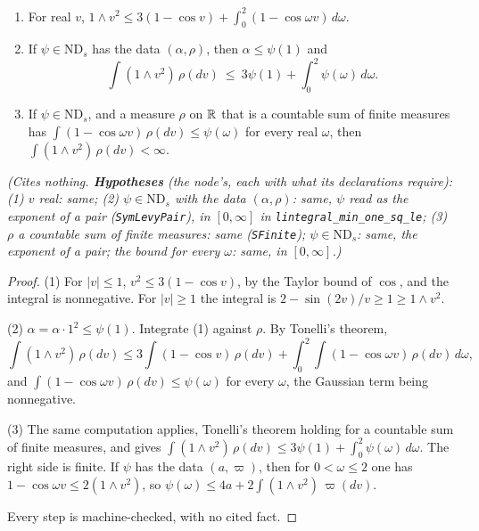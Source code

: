 \begin{lemma}
\label{lem:averaging-bound}
\leanok
{}
\begin{enumerate}
\item For real $v$, $1 \wedge v^2 \le 3(1 - \cos v) + \int_0^2(1 - \cos\omega v)\,d\omega$.
\item If $\psi \in \mathrm{ND}_s$ has the data $(\alpha, \rho)$, then $\alpha \le \psi(1)$ and
\[
  \int(1 \wedge v^2)\,\rho(dv) \ \le\ 3\psi(1) + \int_0^2\psi(\omega)\,d\omega .
\]
\item If $\psi \in \mathrm{ND}_s$, and a measure $\rho$ on $\mathbb{R}$ that is a countable sum of finite
measures has $\int(1 - \cos\omega v)\,\rho(dv) \le \psi(\omega)$ for every real $\omega$, then
$\int(1 \wedge v^2)\,\rho(dv) < \infty$.
\end{enumerate}
\statusT\quad\emph{(Cites nothing. \textbf{Hypotheses} (the node's, each with what its declarations
require): (1) $v$ real: same; (2) $\psi \in \mathrm{ND}_s$ with the data $(\alpha, \rho)$: same, $\psi$
read as the exponent of a pair (\texttt{SymLevyPair}), in $[0,\infty]$ in
\texttt{lintegral\_min\_one\_sq\_le}; (3) $\rho$ a countable sum of finite measures: same
(\texttt{SFinite}); $\psi \in \mathrm{ND}_s$: same, the exponent of a pair; the bound for every
$\omega$: same, in $[0,\infty]$.)}
\end{lemma}

\begin{proof}
\leanok
(1) For $|v| \le 1$, $v^2 \le 3(1 - \cos v)$, by the Taylor bound of $\cos$, and the integral is
nonnegative. For $|v| \ge 1$ the integral is $2 - \sin(2v)/v \ge 1 \ge 1 \wedge v^2$.

(2) $\alpha = \alpha\cdot1^2 \le \psi(1)$. Integrate (1) against $\rho$. By Tonelli's theorem,
\[
  \int(1 \wedge v^2)\,\rho(dv) \le 3\int(1 - \cos v)\,\rho(dv)
  + \int_0^2\int(1 - \cos\omega v)\,\rho(dv)\,d\omega ,
\]
and $\int(1 - \cos\omega v)\,\rho(dv) \le \psi(\omega)$ for every $\omega$, the Gaussian term being
nonnegative.

(3) The same computation applies, Tonelli's theorem holding for a countable sum of finite measures,
and gives $\int(1 \wedge v^2)\,\rho(dv) \le 3\psi(1) + \int_0^2\psi(\omega)\,d\omega$. The right side
is finite. If $\psi$ has the data $(a, \varpi)$, then for $0 < \omega \le 2$ one has
$1 - \cos\omega v \le 2(1 \wedge v^2)$, so $\psi(\omega) \le 4a + 2\int(1 \wedge v^2)\,\varpi(dv)$.

Every step is machine-checked, with no cited fact.
\end{proof}

